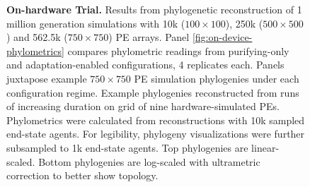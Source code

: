 \begin{figure}
\caption{%
\textbf{On-hardware Trial.}
\footnotesize
Results from phylogenetic reconstruction of 1 million generation simulations with 10k ($100\times100$), 250k ($500\times500$) and 562.5k ($750\times750$) PE arrays.
Panel \ref{fig:on-device-phylometrics} compares phylometric readings from purifying-only and adaptation-enabled configurations, 4 replicates each.
Panels  juxtapose example $750\times750$ PE simulation phylogenies under each configuration regime.
Example phylogenies reconstructed from runs of increasing duration on grid of nine hardware-simulated PEs.
Phylometrics were calculated from reconstructions with 10k sampled end-state agents.
For legibility, phylogeny visualizations were further subsampled to 1k end-state agents.
Top phylogenies are linear-scaled.
Bottom phylogenies are log-scaled with ultrametric correction to better show topology.
}
\label{fig:on-device}
\vspace{-0.2in}
\end{figure}
